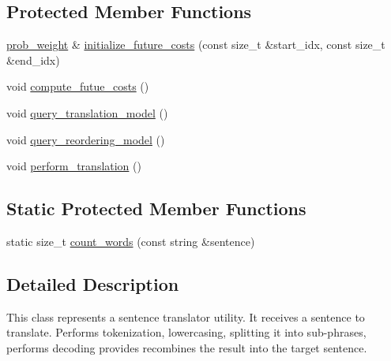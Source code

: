 \subsection*{Protected Member Functions}
\begin{DoxyCompactItemize}
\item 
\hyperlink{namespaceuva_1_1smt_1_1bpbd_1_1server_a01e9ea4de9c226f4464862e84ff0bbcc}{prob\+\_\+weight} \& \hyperlink{classuva_1_1smt_1_1bpbd_1_1server_1_1decoder_1_1sentence_1_1sentence__decoder_a9e5741c0a91513f75f2b17f5ccb38dcc}{initialize\+\_\+future\+\_\+costs} (const size\+\_\+t \&start\+\_\+idx, const size\+\_\+t \&end\+\_\+idx)
\item 
void \hyperlink{classuva_1_1smt_1_1bpbd_1_1server_1_1decoder_1_1sentence_1_1sentence__decoder_aa3fc739ecdfe8401906a7bc4a09dfcd5}{compute\+\_\+futue\+\_\+costs} ()
\item 
void \hyperlink{classuva_1_1smt_1_1bpbd_1_1server_1_1decoder_1_1sentence_1_1sentence__decoder_a87e22dcc71de07d6c9fde0485b86a1ee}{query\+\_\+translation\+\_\+model} ()
\item 
void \hyperlink{classuva_1_1smt_1_1bpbd_1_1server_1_1decoder_1_1sentence_1_1sentence__decoder_afb271393a680ca09b3ff5e3fb588fc09}{query\+\_\+reordering\+\_\+model} ()
\item 
void \hyperlink{classuva_1_1smt_1_1bpbd_1_1server_1_1decoder_1_1sentence_1_1sentence__decoder_a66ed829d6e14d014e57e821e492695e0}{perform\+\_\+translation} ()
\end{DoxyCompactItemize}
\subsection*{Static Protected Member Functions}
\begin{DoxyCompactItemize}
\item 
static size\+\_\+t \hyperlink{classuva_1_1smt_1_1bpbd_1_1server_1_1decoder_1_1sentence_1_1sentence__decoder_a2f3e350f58da546e8f3130e0bd0e03dd}{count\+\_\+words} (const string \&sentence)
\end{DoxyCompactItemize}


\subsection{Detailed Description}
This class represents a sentence translator utility. It receives a sentence to translate. Performs tokenization, lowercasing, splitting it into sub-\/phrases, performs decoding provides recombines the result into the target sentence. 

